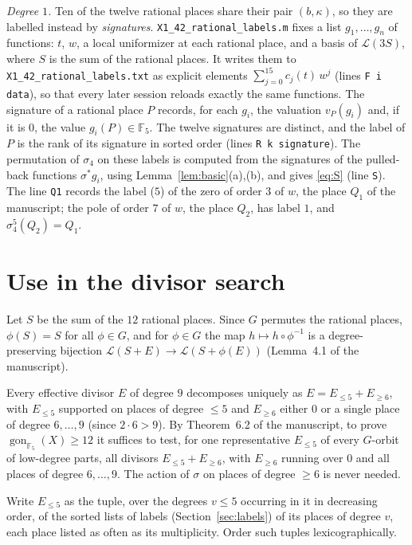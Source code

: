 \documentclass[11pt]{amsart}
\theoremstyle{definition}
\theoremstyle{remark}
\newcommand{\F}{\mathbb{F}}
\newcommand{\gon}{\operatorname{gon}}
\newcommand{\LL}{\mathcal{L}}
\newcommand{\code}[1]{\texttt{#1}}
\begin{document}
\emph{Degree $1$.} Ten of the twelve rational places share their pair $(b,\kappa)$, so they are labelled instead by \emph{signatures}. \code{X1\_42\_rational\_labels.m} fixes a list $g_1,\dots,g_n$ of functions: $t$, $w$, a local uniformizer at each rational place, and a basis of $\LL(3S)$, where $S$ is the sum of the rational places. It writes them to \code{X1\_42\_rational\_labels.txt} as explicit elements $\sum_{j=0}^{15}c_j(t)\,w^j$ (lines \code{F i data}), so that every later session reloads exactly the same functions. The signature of a rational place $P$ records, for each $g_i$, the valuation $v_P(g_i)$ and, if it is $0$, the value $g_i(P)\in\F_5$. The twelve signatures are distinct, and the label of $P$ is the rank of its signature in sorted order (lines \code{R k signature}). The permutation of $\sigma_4$ on these labels is computed from the signatures of the pulled-back functions $\sigma^*g_i$, using Lemma~\ref{lem:basic}(a),(b), and gives \eqref{eq:S} (line \code{S}). The line \code{Q1} records the label ($5$) of the zero of order $3$ of $w$, the place $Q_1$ of the manuscript; the pole of order $7$ of $w$, the place $Q_2$, has label $1$, and $\sigma_4^5(Q_2)=Q_1$.

\section{Use in the divisor search}\label{sec:search}

Let $S$ be the sum of the $12$ rational places. Since $G$ permutes the rational places, $\phi(S)=S$ for all $\phi\in G$, and for $\phi\in G$ the map $h\mapsto h\circ\phi^{-1}$ is a degree-preserving bijection $\LL(S+E)\to\LL(S+\phi(E))$ (Lemma~4.1 of the manuscript).

Every effective divisor $E$ of degree $9$ decomposes uniquely as $E=E_{\le5}+E_{\ge6}$, with $E_{\le5}$ supported on places of degree $\le5$ and $E_{\ge6}$ either $0$ or a single place of degree $6,\dots,9$ (since $2\cdot6>9$). By Theorem~6.2 of the manuscript, to prove $\gon_{\F_5}(X)\ge12$ it suffices to test, for one representative $E_{\le5}$ of every $G$-orbit of low-degree parts, all divisors $E_{\le5}+E_{\ge6}$, with $E_{\ge6}$ running over $0$ and all places of degree $6,\dots,9$. The action of $\sigma$ on places of degree $\ge6$ is never needed.

Write $E_{\le5}$ as the tuple, over the degrees $v\le5$ occurring in it in decreasing order, of the sorted lists of labels (Section~\ref{sec:labels}) of its places of degree $v$, each place listed as often as its multiplicity. Order such tuples lexicographically.
\end{document}
